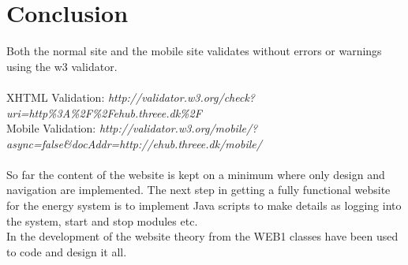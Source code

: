 \chapter{Conclusion}
Both the normal site and the mobile site validates without errors or warnings using the w3 validator. 
\\\\XHTML Validation: \textit{http://validator.w3.org/check?uri=http\%3A\%2F\%2Fehub.threee.dk\%2F}
\\Mobile Validation: \textit{http://validator.w3.org/mobile/?async=false\&docAddr=http://ehub.threee.dk/mobile/}
\\\\So far the content of the website is kept on a minimum where only design and navigation are implemented. The next step in getting a fully functional website for the energy system is to implement Java scripts to make details as logging into the system, start and stop modules etc.
\\In the development of the website theory from the WEB1 classes have been used to code and design it all.
